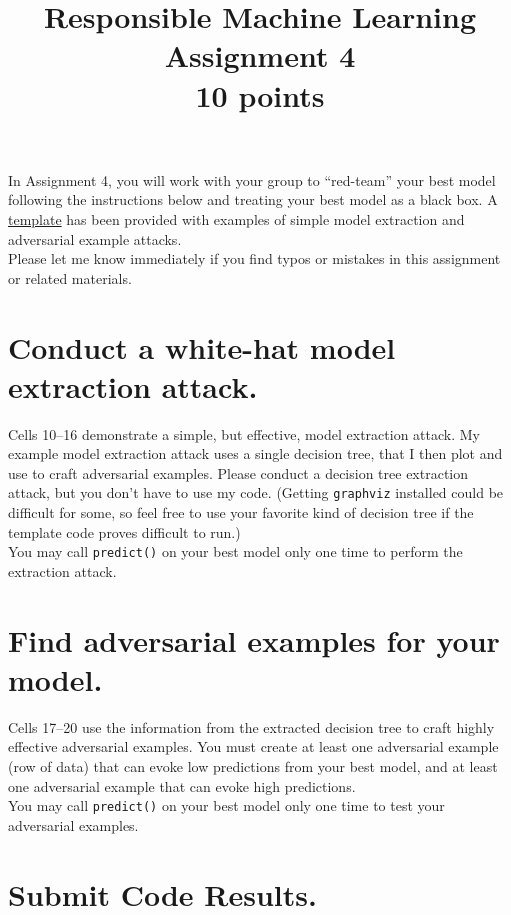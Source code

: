 \documentclass[fleqn]{article}
\title{Responsible Machine Learning\\\Large{Assignment 4}\\\Large{10 points}}
\begin{document}
\maketitle

\noindent In Assignment 4, you will work with your group to ``red-team'' your best model following the instructions below and treating your best model as a black box. A \href{https://nbviewer.jupyter.org/github/jphall663/GWU_rml/blob/master/assignments/assignment_4/assign_4_template.ipynb?flush_cache=true}{template} has been provided with examples of simple model extraction and adversarial example attacks. \\

\noindent Please let me know immediately if you find typos or mistakes in this assignment or related materials. 

\section{Conduct a white-hat model extraction attack.}

Cells 10--16 demonstrate a simple, but effective, model extraction attack. My example model extraction attack uses a single decision tree, that I then plot and use to craft adversarial examples. Please conduct a decision tree extraction attack, but you don't have to use my code. (Getting \texttt{graphviz} installed could be difficult for some, so feel free to use your favorite kind of decision tree if the template code proves difficult to run.)\\

\noindent You may call \texttt{predict()} on your best model only one time to perform the extraction attack.
 
\section{Find adversarial examples for your model.}

Cells 17--20 use the information from the extracted decision tree to craft highly effective adversarial examples. You must create at least one adversarial example (row of data) that can evoke low predictions from your best model, and at least one adversarial example that can evoke high predictions.\\

\noindent You may call \texttt{predict()} on your best model only one time to test your adversarial examples.

\section{Submit Code Results.}
\end{document}

